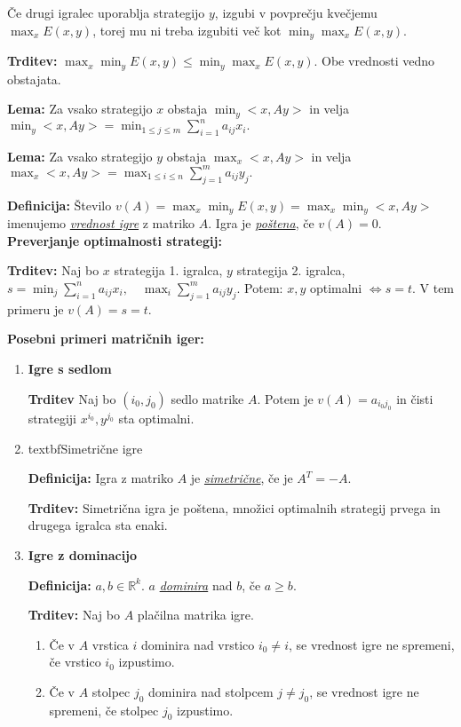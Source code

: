 \documentclass[8pt,a4paper]{amsart}
\theoremstyle{definition} %
\theoremstyle{plain} %
\newcommand{\R}{\mathbb R}
\begin{document}
Če drugi igralec uporablja strategijo $y$, izgubi v povprečju kvečjemu $\max_xE(x,y)$, torej mu ni treba izgubiti več kot $\min_y\max_xE(x,y)$.

\textbf{Trditev:} $\max_x\min_yE(x,y) \leq \min_y\max_xE(x,y)$. Obe vrednosti vedno obstajata.

\textbf{Lema:} Za vsako strategijo $x$ obstaja $\min_y<x,Ay>$ in velja $\min_y<x,Ay> = \min_{1\leq j\leq m}\sum_{i=1}^na_{ij}x_i.$

\textbf{Lema:} Za vsako strategijo $y$ obstaja $\max_x<x,Ay>$ in velja $\max_x<x,Ay> = \max_{1\leq i\leq n}\sum_{j=1}^ma_{ij}y_j.$

\textbf{Definicija:} Število  $ v(A)=\max_x\min_yE(x,y) = \max_x\min_y <x,Ay>$ imenujemo \emph{\underline{vrednost igre}} z matriko $A$. Igra je \emph{\underline{poštena}}, če $v(A)=0$.
\textbf{Preverjanje optimalnosti strategij:}

\textbf{Trditev:} Naj bo $x$ strategija 1. igralca, $y$ strategija 2. igralca, $s = \min_j\sum_{i=1}^{n}a_{ij}x_i, \quad \max_i\sum_{j=1}^{m}a_{ij}y_j$. Potem: $x,y$ optimalni $\Longleftrightarrow s=t$. V tem primeru je $v(A)=s=t$.

\textbf{Posebni primeri matričnih iger:}
\begin{enumerate}
\item \textbf{Igre s sedlom}

\indent \textbf{Trditev} Naj bo $(i_0,j_0)$ sedlo matrike $A$. Potem je $v(A)=a_{i_0j_0}$ in čisti strategiji $x^{i_0},y^{j_0}$ sta optimalni.
\item textbf{Simetrične igre}

\indent \textbf{Definicija:} Igra z matriko $A$ je \emph{\underline{simetrične}}, če je $A^T=-A$.

\indent \textbf{Trditev:} Simetrična igra je poštena, množici optimalnih strategij prvega in drugega igralca sta enaki.

\item \textbf{Igre z dominacijo}

\textbf{Definicija:} $a,b \in \R^k.$ $a$ \emph{\underline{dominira}} nad $b$, če $a \geq b$.


\setlength{\parindent}{0pt}

\textbf{Trditev:} Naj bo $A$ plačilna matrika igre.

\begin{enumerate}
\item Če v $A$ vrstica $i$ dominira nad vrstico $i_0 \neq i$, se vrednost igre ne spremeni, če vrstico $i_0$ izpustimo.
\item Če v $A$ stolpec $j_0$ dominira nad stolpcem $j \neq j_0$, se vrednost igre ne spremeni, če stolpec $j_0$ izpustimo.
\end{enumerate}
\end{enumerate}
\end{document}
